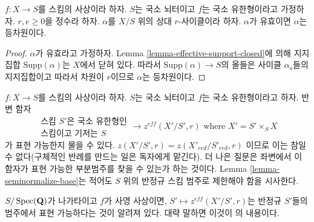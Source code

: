 \begin{lemma}
\label{lemma-effective-equidimensional}
$f : X \to S$를 스킴의 사상이라 하자. $S$는 국소 뇌터이고 $f$는
국소 유한형이라고 가정하자. $r, e \geq 0$을 정수라 하자. $\alpha$를
$X/S$ 위의 상대 $r$-사이클이라 하자. $\alpha$가 유효이면 $\alpha$는
등차원이다.
\end{lemma}

\begin{proof}
$\alpha$가 유효라고 가정하자. Lemma
\ref{lemma-effective-support-closed}에 의해 지지집합
$\text{Supp}(\alpha)$는 $X$에서 닫혀 있다. 따라서
$\text{Supp}(\alpha) \to S$의 올들은 사이클 $\alpha_s$들의
지지집합이고 따라서 차원이 $r$이므로 $\alpha$는 등차원이다.
\end{proof}

\begin{remark}
\label{remark-representable}
$f : X \to S$를 스킴의 사상이라 하자. $S$는 국소 뇌터이고 $f$는
국소 유한형이라고 하자. 반변 함자
$$
\begin{matrix}
\text{스킴 }S'\text{은 국소 유한형인} \\
\text{스킴이고 기저는 }S
\end{matrix}
\longrightarrow
z^{eff}(X'/S', r)\text{ where }X' = S' \times_S X
$$
가 표현 가능한지 물을 수 있다. $z(X'/S', r) = z(X'_{red}/S'_{red}, r)$
이므로 이는 참일 수 없다(구체적인 반례를 만드는 일은 독자에게
맡긴다). 더 나은 질문은 좌변에서 이 함자가 표현 가능한 부분범주를
찾을 수 있는가 하는 것이다. Lemma \ref{lemma-seminormalize-base}는
적어도 $S$ 위의 반정규 스킴 범주로 제한해야 함을 시사한다.

\medskip\noindent
$S/\mathop{\mathrm{Spec}}(\mathbf{Q})$가 나가타이고 $f$가 사영 사상이면,
$S' \mapsto z^{eff}(X'/S', r)$는 반정규 $S'$들의 범주에서 표현
가능하다는 것이 알려져 있다. 대략 말하면 이것이
\cite[Theorem 3.21]{KRC}의 내용이다.


\end{remark}
